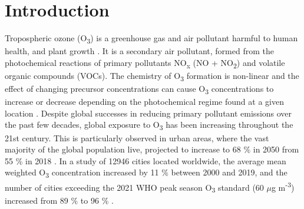 \documentclass[journal abbreviation, manuscript]{copernicus}
\begin{document}
\section{Introduction}  %
Tropospheric ozone (O\textsubscript{3}) is a greenhouse gas and air pollutant harmful to human health, and plant growth \citep{fleming_2018, mills_2018, szopa_2021}. It is a secondary air pollutant, formed from the photochemical reactions of primary pollutants NO\textsubscript{x} (NO + NO\textsubscript{2}) and volatile organic compounds (VOCs). The chemistry of O\textsubscript{3} formation is non-linear and the effect of changing precursor concentrations can cause O\textsubscript{3} concentrations to increase or decrease depending on the photochemical regime found at a given location \citep{ https://doi.org/10.1029/JD095iD02p01837, SILLMAN2002339}. Despite global successes in reducing primary pollutant emissions over the past few decades, global exposure to O\textsubscript{3} has been increasing throughout the 21st century. This is particularly observed in urban areas, where the vast majority of the global population live, projected to increase to 68 \% in 2050 from 55 \% in 2018 \citep{un_2019}. In a study of 12946 cities located worldwide, the average mean weighted O\textsubscript{3} concentration increased by 11 \% between 2000 and 2019, and the number of cities exceeding the 2021 WHO peak season O\textsubscript{3} standard (60 $\mu$g m\textsuperscript{-3}) increased from 89 \% to 96 \% \citep{Malashock_2022}.
\end{document}
